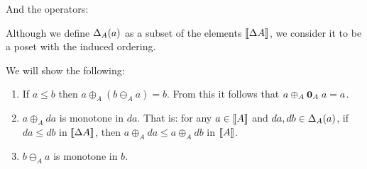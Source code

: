 \documentclass{article}
\begin{document}
And the operators:
\begin{center}
\end{center}

Although we define $\Delta_{A}({a})$ as a subset of the elements ${\left\llbracket{\Delta{A}}\right\rrbracket}$,
we consider it to be a poset with the induced ordering.

We will show the following:

\begin{enumerate}
\item If $a \le b$ then $a \oplus_A (b \ominus_A a) = b$. From this it
  follows that $a \oplus_A \mathbf{0}_A\; a = a$.

\item $a \oplus_A da$ is monotone in $da$. That is: for any $a \in {\left\llbracket{A}\right\rrbracket}$ and
  $da, db \in \Delta_{A}({a})$, if $da \le db$ in ${\left\llbracket{\Delta{A}}\right\rrbracket}$, then $a
  \oplus_A da \le a \oplus_A db$ in ${\left\llbracket{A}\right\rrbracket}$.

\item {} $b \ominus_A a$ is
  monotone in $b$.
\end{enumerate}

\end{document}
